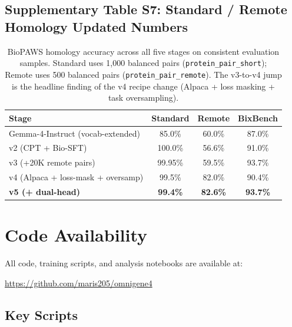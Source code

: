\documentclass[11pt]{article}
\begin{document}
\subsection{Supplementary Table S7: Standard / Remote Homology Updated Numbers}

\begin{table}[H]
\centering
\caption{BioPAWS homology accuracy across all five stages on consistent evaluation samples. Standard uses 1{,}000 balanced pairs (\texttt{protein\_pair\_short}); Remote uses 500 balanced pairs (\texttt{protein\_pair\_remote}). The v3-to-v4 jump is the headline finding of the v4 recipe change (Alpaca + loss masking + task oversampling).}
\begin{tabular}{lccc}
\toprule
\textbf{Stage} & \textbf{Standard} & \textbf{Remote} & \textbf{BixBench} \\
\midrule
Gemma-4-Instruct (vocab-extended)  & 85.0\% & 60.0\% & 87.0\% \\
v2 (CPT + Bio-SFT)                 & 100.0\% & 56.6\% & 91.0\% \\
v3 (+20K remote pairs)             & 99.95\% & 59.5\% & 93.7\% \\
v4 (Alpaca + loss-mask + oversamp) & 99.5\% & 82.0\% & 90.4\% \\
\textbf{v5 (+ dual-head)}          & \textbf{99.4\%} & \textbf{82.6\%} & \textbf{93.7\%} \\
\bottomrule
\end{tabular}
\end{table}

\newpage
\section{Code Availability}

All code, training scripts, and analysis notebooks are available at:

\begin{center}
\url{https://github.com/maris205/omnigene4}
\end{center}

\subsection{Key Scripts}
\end{document}
